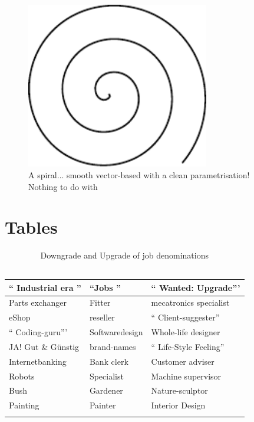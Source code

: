 \begin{figure}[h]
\centering
\includegraphics[width=8cm]{pics/spiral.pdf}
\caption{A spiral... smooth vector-based with a clean parametrisation! \\ Nothing to do with \cite{Gage:18}}\label{fig:spiral}
\end{figure}
\FloatBarrier

\section{Tables}

\begin{table}[H]
\small
\centering
\begin{tabular}{p{5cm}|l|p{3cm}}
`` Industrial era '' &  ``Jobs '' & `` Wanted: Upgrade''' \\ \hline
Parts exchanger & Fitter & mecatronics specialist \\
eShop & reseller & `` Client-suggester'' \\
`` Coding-guru''' & Softwaredesign & Whole-life designer \\
JA! Gut \& Günstig & brand-names & `` Life-Style Feeling'' \\
Internetbanking & Bank clerk & Customer adviser \\
Robots & Specialist & Machine supervisor \\
Bush & Gardener & Nature-sculptor \\
Painting & Painter & Interior Design \\
 &  & \\
\end{tabular}
\caption[Downgrade and upgrade of job denominations]{Downgrade and Upgrade of job denominations \\ \ \ \ \cite{DueckKo:2016}}
\label{tab:Downgrade and Upgrade of job denominations}
\end{table} 

